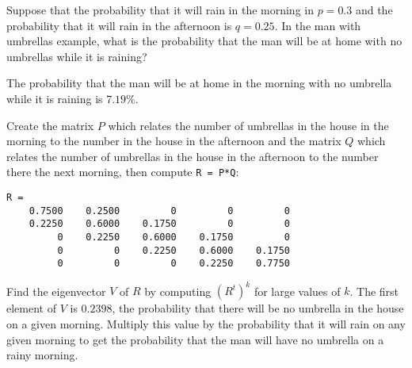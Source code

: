 \documentclass{ximera}
\begin{document}
\begin{exercise} \label{c4.10.8}
Suppose that the probability that it will rain in the morning in $p=0.3$ and
the probability that it will rain in the afternoon is $q=0.25$.  In the man
with umbrellas example, what is the probability that the man will be at home
with no umbrellas while it is raining?

\begin{solution}

\ans The probability that the man will be at home in the morning with
no umbrella while it is raining is $7.19\%$. 

\soln Create the matrix $P$ which relates the number of umbrellas in the
house in the morning to the number in the house in the afternoon and the
matrix $Q$ which relates the number of umbrellas in the house in the
afternoon to the number there the next morning, then compute {\tt R = P*Q}:
\begin{verbatim}
R =
    0.7500    0.2500         0         0         0
    0.2250    0.6000    0.1750         0         0
         0    0.2250    0.6000    0.1750         0
         0         0    0.2250    0.6000    0.1750
         0         0         0    0.2250    0.7750
\end{verbatim}
Find the eigenvector $V$ of $R$ by computing $(R^t)^k$ for large values
of $k$.  The first element of $V$ is $0.2398$, the probability that there
will be no umbrella in the house on a given morning.  Multiply this
value by the probability that it will rain on any given morning to get
the probability that the man will have no umbrella on a rainy morning.


\end{solution}
\end{exercise}
\end{document}
